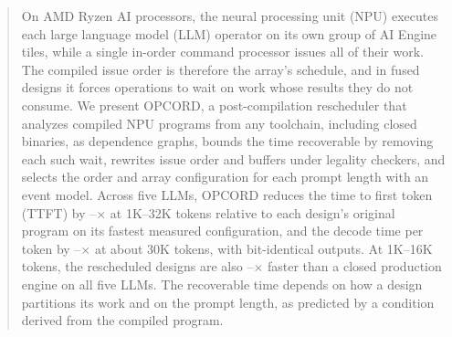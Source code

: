 \begin{abstract}
On AMD Ryzen\texttrademark{} AI processors, the neural processing unit (NPU) executes each large language model (LLM) operator on its own group of AI Engine tiles, while a single in-order command processor issues all of their work.
The compiled issue order is therefore the array's schedule, and in fused designs it forces operations to wait on work whose results they do not consume.
We present OPCORD, a post-compilation rescheduler that analyzes compiled NPU programs from any toolchain, including closed binaries, as dependence graphs, bounds the time recoverable by removing each such wait, rewrites issue order and buffers under legality checkers, and selects the order and array configuration for each prompt length with an event model.
Across five LLMs, OPCORD reduces the time to first token (TTFT) by \PrefillGainLo--\PrefillGainHi$\times$ at 1K--32K tokens relative to each design's original program on its fastest measured configuration, and the decode time per token by \DecodeGainLo--\DecodeGainHi$\times$ at about 30K tokens, with bit-identical outputs.
At 1K--16K tokens, the rescheduled designs are also \AbsGainLo--\AbsGainHi$\times$ faster than a closed production engine on all five LLMs.
The recoverable time depends on how a design partitions its work and on the prompt length, as predicted by a condition derived from the compiled program.

\end{abstract}
